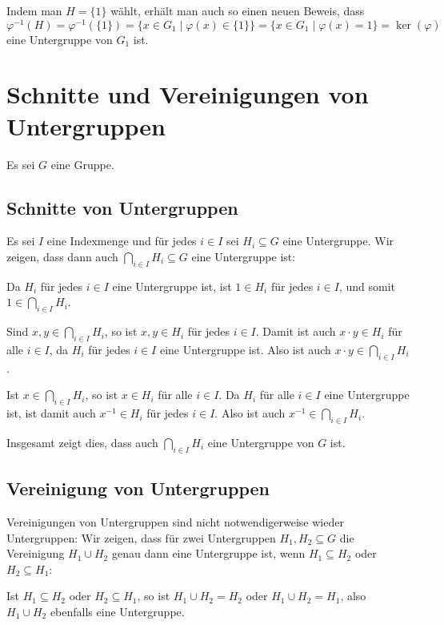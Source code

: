 \begin{bem}
 Indem man $H = \{1\}$ wählt, erhält man auch so einen neuen Beweis, dass
 \[
  \varphi^{-1}(H)
  = \varphi^{-1}(\{1\})
  = \{x \in G_1 \mid \varphi(x) \in \{1\}\}
  = \{x \in G_1 \mid \varphi(x) = 1\}
  = \ker(\varphi)
 \]
 eine Untergruppe von $G_1$ ist.
\end{bem}





\section{Schnitte und Vereinigungen von Untergruppen}
Es sei $G$ eine Gruppe.


\subsection{Schnitte von Untergruppen}
Es sei $I$ eine Indexmenge und für jedes $i \in I$ sei $H_i \subseteq G$ eine Untergruppe. Wir zeigen, dass dann auch $\bigcap_{i \in I} H_i \subseteq G$ eine Untergruppe ist:

Da $H_i$ für jedes $i \in I$ eine Untergruppe ist, ist $1 \in H_i$ für jedes $i \in I$, und somit $1 \in \bigcap_{i \in I} H_i$.

Sind $x,y \in \bigcap_{i \in I} H_i$, so ist $x,y \in H_i$ für jedes $i \in I$. Damit ist auch $x \cdot y \in H_i$ für alle $i \in I$, da $H_i$ für jedes $i \in I$ eine Untergruppe ist. Also ist auch $x \cdot y \in \bigcap_{i \in I} H_i$.

Ist $x \in \bigcap_{i \in I} H_i$, so ist $x \in H_i$ für alle $i \in I$. Da $H_i$ für alle $i \in I$ eine Untergruppe ist, ist damit auch $x^{-1} \in H_i$ für jedes $i \in I$. Also ist auch $x^{-1} \in \bigcap_{i \in I} H_i$.

Insgesamt zeigt dies, dass auch $\bigcap_{i \in I} H_i$ eine Untergruppe von $G$ ist.


\subsection{Vereinigung von Untergruppen}
Vereinigungen von Untergruppen sind nicht notwendigerweise wieder Untergruppen: Wir zeigen, dass für zwei Untergruppen $H_1, H_2 \subseteq G$ die Vereinigung $H_1 \cup H_2$ genau dann eine Untergruppe ist, wenn $H_1 \subseteq H_2$ oder $H_2 \subseteq H_1$:

Ist $H_1 \subseteq H_2$ oder $H_2 \subseteq H_1$, so ist $H_1 \cup H_2 = H_2$ oder $H_1 \cup H_2 = H_1$, also $H_1 \cup H_2$ ebenfalls eine Untergruppe.

